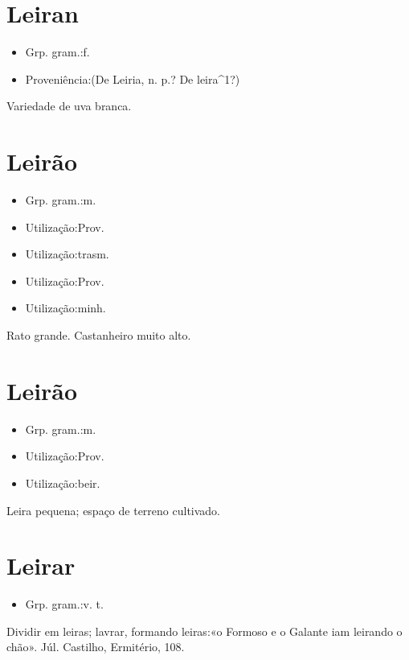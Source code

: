 \section{Leiran}
\begin{itemize}
\item {Grp. gram.:f.}
\end{itemize}
\begin{itemize}
\item {Proveniência:(De \textunderscore Leiria\textunderscore , n. p.? De \textunderscore leira\textunderscore ^1?)}
\end{itemize}
Variedade de uva branca.
\section{Leirão}
\begin{itemize}
\item {Grp. gram.:m.}
\end{itemize}
\begin{itemize}
\item {Utilização:Prov.}
\end{itemize}
\begin{itemize}
\item {Utilização:trasm.}
\end{itemize}
\begin{itemize}
\item {Utilização:Prov.}
\end{itemize}
\begin{itemize}
\item {Utilização:minh.}
\end{itemize}
Rato grande.
Castanheiro muito alto.
\section{Leirão}
\begin{itemize}
\item {Grp. gram.:m.}
\end{itemize}
\begin{itemize}
\item {Utilização:Prov.}
\end{itemize}
\begin{itemize}
\item {Utilização:beir.}
\end{itemize}
Leira pequena; espaço de terreno cultivado.
\section{Leirar}
\begin{itemize}
\item {Grp. gram.:v. t.}
\end{itemize}
Dividir em leiras; lavrar, formando leiras:«\textunderscore o Formoso e o Galante iam leirando o chão\textunderscore ». Júl. Castilho, \textunderscore Ermitério\textunderscore , 108.
